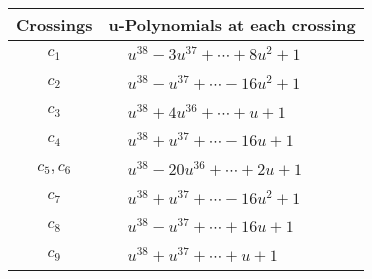 \documentclass[1p]{elsarticle_modified}
\theoremstyle{definition}
\begin{document}
\begin{tabular}{m{50pt}|m{274pt}}
Crossings & \hspace{64pt}u-Polynomials at each crossing \\
\hline $$\begin{aligned}c_{1}\end{aligned}$$&$\begin{aligned}
&u^{38}-3 u^{37}+\cdots+8 u^2+1
\end{aligned}$\\
\hline $$\begin{aligned}c_{2}\end{aligned}$$&$\begin{aligned}
&u^{38}- u^{37}+\cdots-16 u^2+1
\end{aligned}$\\
\hline $$\begin{aligned}c_{3}\end{aligned}$$&$\begin{aligned}
&u^{38}+4 u^{36}+\cdots+u+1
\end{aligned}$\\
\hline $$\begin{aligned}c_{4}\end{aligned}$$&$\begin{aligned}
&u^{38}+u^{37}+\cdots-16 u+1
\end{aligned}$\\
\hline $$\begin{aligned}c_{5},c_{6}\end{aligned}$$&$\begin{aligned}
&u^{38}-20 u^{36}+\cdots+2 u+1
\end{aligned}$\\
\hline $$\begin{aligned}c_{7}\end{aligned}$$&$\begin{aligned}
&u^{38}+u^{37}+\cdots-16 u^2+1
\end{aligned}$\\
\hline $$\begin{aligned}c_{8}\end{aligned}$$&$\begin{aligned}
&u^{38}- u^{37}+\cdots+16 u+1
\end{aligned}$\\
\hline $$\begin{aligned}c_{9}\end{aligned}$$&$\begin{aligned}
&u^{38}+u^{37}+\cdots+u+1
\end{aligned}$\\

\end{tabular}
\end{document}
